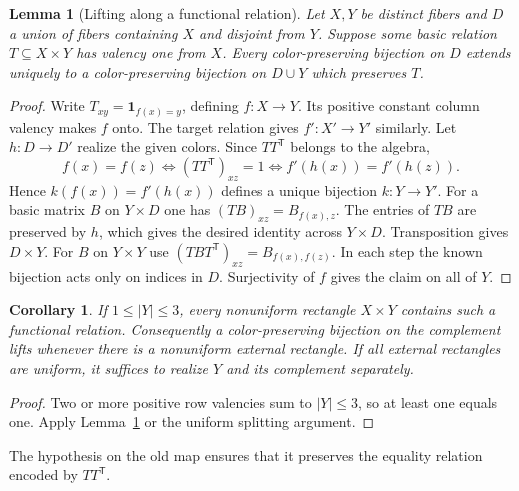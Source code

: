 \documentclass[11pt,reqno]{amsart}
\numberwithin{equation}{section}
\newtheorem{lemma}[theorem]{Lemma}
\newtheorem{corollary}[theorem]{Corollary}
\theoremstyle{definition}
\begin{document}
\begin{lemma}[Lifting along a functional relation]\label{lem:functional}
Let $X,Y$ be distinct fibers and $D$ a union of fibers containing $X$ and disjoint from $Y$. Suppose some basic relation $T\subseteq X\times Y$ has valency one from $X$. Every color-preserving bijection on $D$ extends uniquely to a color-preserving bijection on $D\cup Y$ which preserves $T$.
\end{lemma}
\begin{proof}
Write $T_{xy}=\mathbf{1}_{f(x)=y}$, defining $f:X\to Y$. Its positive constant column valency makes $f$ onto. The target relation gives $f':X'\to Y'$ similarly. Let $h:D\to D'$ realize the given colors. Since $TT^{\mathsf T}$ belongs to the algebra,
\[
 f(x)=f(z)\iff (TT^{\mathsf T})_{xz}=1
          \iff f'(h(x))=f'(h(z)).
\]
Hence $k(f(x))=f'(h(x))$ defines a unique bijection $k:Y\to Y'$. For a basic matrix $B$ on $Y\times D$ one has $(TB)_{xz}=B_{f(x),z}$. The entries of $TB$ are preserved by $h$, which gives the desired identity across $Y\times D$. Transposition gives $D\times Y$. For $B$ on $Y\times Y$ use
$(TBT^{\mathsf T})_{xz}=B_{f(x),f(z)}$. In each step the known bijection acts only on indices in $D$. Surjectivity of $f$ gives the claim on all of $Y$.
\end{proof}
\begin{corollary}
If $1\le |Y|\le3$, every nonuniform rectangle $X\times Y$ contains such a functional relation. Consequently a color-preserving bijection on the complement lifts whenever there is a nonuniform external rectangle. If all external rectangles are uniform, it suffices to realize $Y$ and its complement separately.
\end{corollary}
\begin{proof}
Two or more positive row valencies sum to $|Y|\le3$, so at least one equals one. Apply Lemma~\ref{lem:functional} or the uniform splitting argument.
\end{proof}
The hypothesis on the old map ensures that it preserves the equality relation encoded by $TT^{\mathsf T}$.
\end{document}
